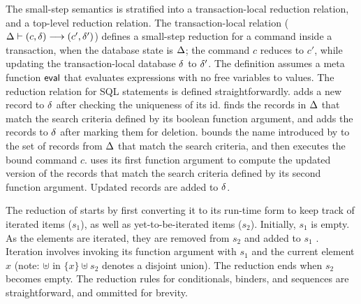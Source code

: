 The small-step semantics is stratified into a transaction-local reduction
relation, and a top-level reduction relation. The transaction-local
relation ($\Delta \vdash (c,\delta) \longrightarrow (c',\delta')$) defines a
small-step reduction for a command inside a transaction, when the
database state is $\Delta$; the command $c$ reduces to $c'$, while
updating the transaction-local database $\delta$ to $\delta'$. The
definition assumes a meta function $\textsf{eval}$ that evaluates expressions
with no free variables to values. The reduction relation for SQL
statements is defined straightforwardly.  adds a new record
to $\delta$ after checking the uniqueness of its id.  finds
the records in $\Delta$ that match the search criteria defined by its
boolean function argument, and adds the records to $\delta$ after
marking them for deletion.  bounds the name introduced by
 to the set of records from $\Delta$ that match the search
criteria, and then executes the bound command $c$.  uses its
first function argument to compute the updated version of the records
that match the search criteria defined by its second function
argument. Updated records are added to $\delta$. 

The reduction of  starts by first converting it to its
run-time form to keep track of iterated items ($s_1$),
as well as  yet-to-be-iterated items ($s_2$). Initially, $s_1$ is
empty. As the elements are iterated, they are removed from $s_2$ and
added to $s_1$ . Iteration involves invoking its function argument
with $s_1$ and the current element $x$ (note: $\uplus$ in $\{x\}
\uplus s_2$ denotes a disjoint union). The reduction ends when 
$s_2$ becomes empty. The reduction rules for conditionals, 
binders, and sequences are straightforward, and ommitted for brevity.

